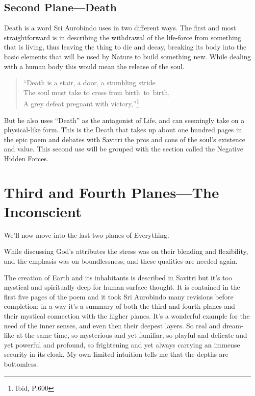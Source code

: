 \documentclass[12pt,a4paper]{book}
\begin{document}
\newpage
\begin{center}\section*{Second Plane---Death}\end{center}

Death is a word Sri Aurobindo uses in two different ways. The first
and most straightforward is in describing the withdrawal of the
life-force from something that is living, thus leaving the thing to
die and decay, breaking its body into the basic elements that will be
used by Nature to build something new. While dealing with a human body
this would mean the release of the soul.

\begin{verse}
``Death is a stair, a door, a stumbling stride\\
The soul must take to cross from birth~to~birth,\\
A grey defeat pregnant with victory,''\footnote{Ibid, P.600}
\end{verse}

But he also uses ``Death'' as the antagonist of Life, and can
seemingly take on a physical-like form. This is the Death that takes
up about one hundred pages in the epic poem and debates with Savitri
the pros and cons of the soul's existence and value. This second use
will be grouped with the section called the Negative Hidden Forces.


\newpage
\section*{Third and Fourth Planes---The Inconscient}

We'll now move into the last two planes of Everything.

While discussing God's attributes the stress was on their blending and
flexibility, and the emphasis was on boundlessness, and these
qualities are needed again.

The creation of Earth and its inhabitants is described in Savitri but
it's too mystical and spiritually deep for human surface thought. It
is contained in the first five pages of the poem and it took Sri
Aurobindo many revisions before completion; in a way it's a summary of
both the third and fourth planes and their mystical connection with
the higher planes. It's a wonderful example for the need of the inner
senses, and even then their deepest layers. So real and dream-like at
the same time, so mysterious and yet familiar, so playful and delicate
and yet powerful and profound, so frightening and yet always carrying
an immense security in its cloak. My own limited intuition tells me
that the depths are bottomless.
\end{document}
